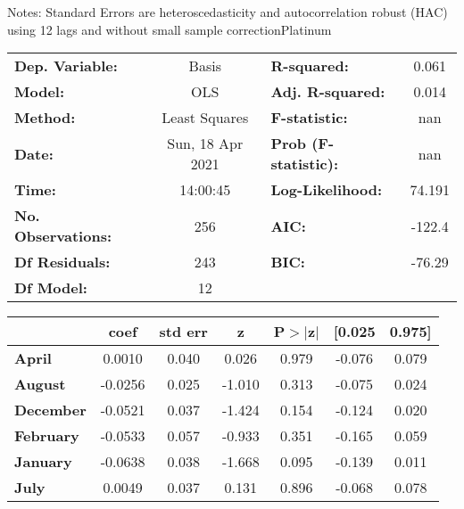 Notes: \newline
 [1] Standard Errors are heteroscedasticity and autocorrelation robust (HAC) using 12 lags and without small sample correctionPlatinum\begin{center}
\begin{tabular}{lclc}
\toprule
\textbf{Dep. Variable:}    &      Basis       & \textbf{  R-squared:         } &     0.061   \\
\textbf{Model:}            &       OLS        & \textbf{  Adj. R-squared:    } &     0.014   \\
\textbf{Method:}           &  Least Squares   & \textbf{  F-statistic:       } &       nan   \\
\textbf{Date:}             & Sun, 18 Apr 2021 & \textbf{  Prob (F-statistic):} &      nan    \\
\textbf{Time:}             &     14:00:45     & \textbf{  Log-Likelihood:    } &    74.191   \\
\textbf{No. Observations:} &         256      & \textbf{  AIC:               } &    -122.4   \\
\textbf{Df Residuals:}     &         243      & \textbf{  BIC:               } &    -76.29   \\
\textbf{Df Model:}         &          12      & \textbf{                     } &             \\
\bottomrule
\end{tabular}
\begin{tabular}{lcccccc}
                   & \textbf{coef} & \textbf{std err} & \textbf{z} & \textbf{P$> |$z$|$} & \textbf{[0.025} & \textbf{0.975]}  \\
\midrule
\textbf{April}     &       0.0010  &        0.040     &     0.026  &         0.979        &       -0.076    &        0.079     \\
\textbf{August}    &      -0.0256  &        0.025     &    -1.010  &         0.313        &       -0.075    &        0.024     \\
\textbf{December}  &      -0.0521  &        0.037     &    -1.424  &         0.154        &       -0.124    &        0.020     \\
\textbf{February}  &      -0.0533  &        0.057     &    -0.933  &         0.351        &       -0.165    &        0.059     \\
\textbf{January}   &      -0.0638  &        0.038     &    -1.668  &         0.095        &       -0.139    &        0.011     \\
\textbf{July}      &       0.0049  &        0.037     &     0.131  &         0.896        &       -0.068    &        0.078     \\

\end{tabular}
\end{center}
